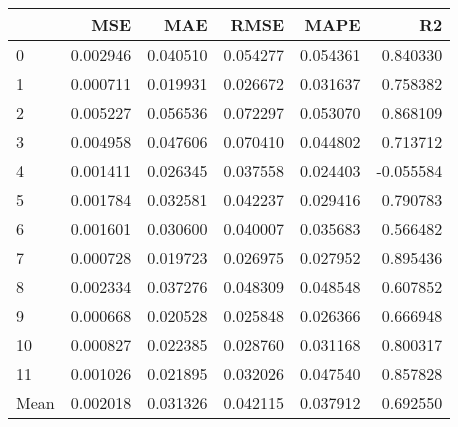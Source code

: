 \begin{tabular}{lrrrrr}
\toprule
 & MSE & MAE & RMSE & MAPE & R2 \\
\midrule
0 & 0.002946 & 0.040510 & 0.054277 & 0.054361 & 0.840330 \\
1 & 0.000711 & 0.019931 & 0.026672 & 0.031637 & 0.758382 \\
2 & 0.005227 & 0.056536 & 0.072297 & 0.053070 & 0.868109 \\
3 & 0.004958 & 0.047606 & 0.070410 & 0.044802 & 0.713712 \\
4 & 0.001411 & 0.026345 & 0.037558 & 0.024403 & -0.055584 \\
5 & 0.001784 & 0.032581 & 0.042237 & 0.029416 & 0.790783 \\
6 & 0.001601 & 0.030600 & 0.040007 & 0.035683 & 0.566482 \\
7 & 0.000728 & 0.019723 & 0.026975 & 0.027952 & 0.895436 \\
8 & 0.002334 & 0.037276 & 0.048309 & 0.048548 & 0.607852 \\
9 & 0.000668 & 0.020528 & 0.025848 & 0.026366 & 0.666948 \\
10 & 0.000827 & 0.022385 & 0.028760 & 0.031168 & 0.800317 \\
11 & 0.001026 & 0.021895 & 0.032026 & 0.047540 & 0.857828 \\
Mean & 0.002018 & 0.031326 & 0.042115 & 0.037912 & 0.692550 \\
\bottomrule
\end{tabular}
